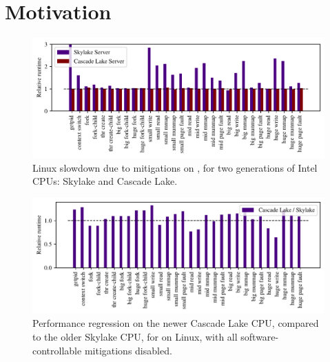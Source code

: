 \section*{Motivation}
\label{s:motivation}

\begin{figure}[t]
  \begin{center}
    \includegraphics{results/bhw2_bhw3_overhead}
  \end{center}
\vspace{-\baselineskip}
\caption{Linux slowdown due to mitigations on \bench, for two generations of Intel CPUs: Skylake and Cascade Lake.}
\label{fig:linuxslowdown}
\end{figure}

\begin{figure}[t]
  \begin{center}
    \includegraphics{results/cascade_lake_regression}
  \end{center}
\vspace{-\baselineskip}
\caption{Performance regression on the newer Cascade Lake CPU, compared to the older Skylake CPU,
  for \bench on Linux, with all software-controllable mitigations disabled.}
\label{fig:regression}
\end{figure}

